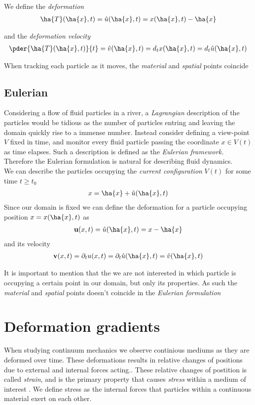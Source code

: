 We define the \textit{deformation} 
\begin{align}
\ha{T}(\ha{x}, t) = \hat{u}(\ha{x},t) = x(\ha{x},t) - \ha{x} 
\end{align}

and the \textit{deformation velocity}
\begin{align}
\pder{\ha{T}(\ha{x}, t)}{t} = \hat{v}(\ha{x},t) = d_t x(\ha{x},t) = d_t \hat{u}(\ha{x},t) 
\end{align}

When tracking each particle as it moves, the \textit{material} and \textit{spatial} points coincide

\subsection{Eulerian}
Considering a flow of fluid particles in a river, a \textit{Lagrangian} description of the particles would be tidious as the number of particles entring and leaving the domain quickly rise to a immense number. 
Instead consider defining a view-point $V$ fixed in time, and monitor every fluid particle passing the coordinate $x \in V(t)$ as time elapses. Such a description is defined as the \textit{Eulerian framework.} 
Therefore the Eulerian formulation is natural for describing fluid dynamics. \\
We can describe the particles occupying the \textit{current configuration} $V(t)$ for some time $t \geq t_0$ 
\begin{align*}
x = \ha{x} + \hat{u}(\ha{x}, t)	
\end{align*}
Since our domain is fixed we can define the deformation for a particle 
occupying position $x = x(\ha{x},t)$ as
\begin{align*}
\textbf{u}(x, t) = \hat{u}(\ha{x}, t) = x - \ha{x}	\\
\end{align*}
and its velocity
\begin{align*}
\textbf{v}(x,t) = \partial_t u(x,t) = \partial_t \hat{u}(\ha{x},t) = \hat{v}(\ha{x},t)
\end{align*}

It is important to mention that the we are not interested in which particle is occupying a certain point in our domain, but only its properties. As such the \textit{material} and \textit{spatial} points doesn't coincide in the \textit{Eulerian formulation}


\section{Deformation gradients}
When studying continuum mechanics we observe continious mediums as they are deformed over time. These deformations
results in relative changes of positions due to external and internal forces acting.. These relative changes of postition is called
\textit{strain}, and is the primary property that causes \textit{stress} within a medium of interest \cite{Richter2016}. We define stress as the internal forces that particles within a continuous material exert on each other. \\

